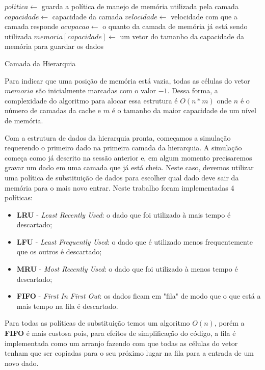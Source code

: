 \documentclass[12pt]{article}
\begin{document}
\begin{algorithm}[h!]
\begin{footnotesize}
$politica\longleftarrow$ guarda a política de manejo de memória utilizada pela camada\;
$capacidade\longleftarrow$ capacidade da camada\;
$velocidade\longleftarrow$ velocidade com que a camada responde\;
$ocupacao\longleftarrow$ o quanto da camada de memória já está sendo utilizada\;
$memoria[capacidade]\longleftarrow$ um vetor do tamanho da capacidade da memória para guardar os dados\;
\caption{Camada da Hierarquia}
\end{footnotesize}
\end{algorithm}

Para indicar que uma posição de memória está vazia, todas as células do vetor $memoria$ são inicialmente marcadas com o valor $-1$. Dessa forma, a complexidade do algoritmo para alocar essa estrutura é $O(n * m)$ onde $n$ é o número de camadas da cache e $m$ é o tamanho da maior capacidade de um nível de memória.

Com a estrutura de dados da hierarquia pronta, começamos a simulação requerendo o primeiro dado na primeira camada da hierarquia. A simulação começa como já descrito na sessão anterior e, em algum momento precisaremos gravar um dado em uma camada que já está cheia. Neste caso, devemos utilizar uma política de substituição de dados para escolher qual dado deve sair da memória para o mais novo entrar. Neste trabalho foram implementadas 4 políticas:

\begin{itemize}
  \item \textbf{LRU} - \textit{Least Recently Used}: o dado que foi utilizado à mais tempo é descartado;
  \item \textbf{LFU} - \textit{Least Frequently Used}: o dado que é utilizado menos frequentemente que os outros é descartado;
  \item \textbf{MRU} - \textit{Most Recently Used}: o dado que foi utilizado à menos tempo é descartado;
  \item \textbf{FIFO} - \textit{First In First Out}: os dados ficam em "fila" de modo que o que está a mais tempo na fila é descartado.
\end{itemize}

Para todas as políticas de substituição temos um algoritmo $O(n)$, porém a \textbf{FIFO} é mais custosa pois, para efeitos de simplificação do código, a fila é implementada como um arranjo fazendo com que todas as células do vetor tenham que ser copiadas para o seu próximo lugar na fila para a entrada de um novo dado.
\end{document}
